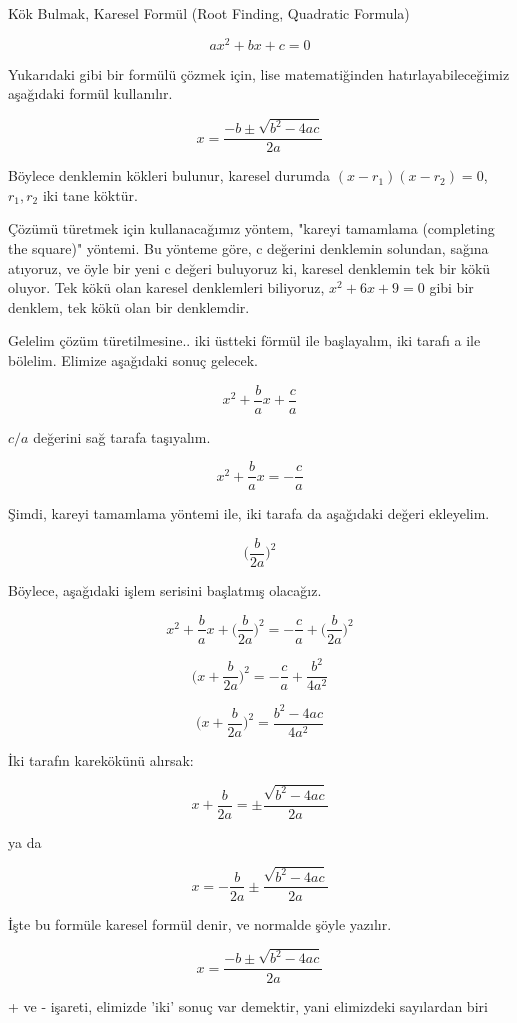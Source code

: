\documentclass[12pt,fleqn]{article}\usepackage{../../common}
\begin{document}
Kök Bulmak, Karesel Formül (Root Finding, Quadratic Formula)

$$ ax^2 + bx + c = 0$$

Yukarıdaki gibi bir formülü çözmek için, lise matematiğinden
hatırlayabileceğimiz aşağıdaki formül kullanılır.

$$ x = \frac{-b \pm \sqrt{b^2-4ac}}{2a} $$

Böylece denklemin kökleri bulunur, karesel durumda $(x-r_1)(x-r_2)=0$,
$r_1,r_2$ iki tane köktür.

Çözümü türetmek için kullanacağımız yöntem, "kareyi tamamlama (completing
the square)" yöntemi. Bu yönteme göre, c değerini denklemin solundan,
sağına atıyoruz, ve öyle bir yeni c değeri buluyoruz ki, karesel denklemin
tek bir kökü oluyor. Tek kökü olan karesel denklemleri biliyoruz, $x^2 +
6x + 9 = 0$ gibi bir denklem, tek kökü olan bir denklemdir.

Gelelim çözüm türetilmesine.. iki üstteki förmül ile başlayalım, iki tarafı
a ile bölelim. Elimize aşağıdaki sonuç gelecek.

$$ x^2 + \frac{b}{a}x + \frac{c}{a} $$

$c/a$ değerini sağ tarafa taşıyalım. 

$$ x^2 + \frac{b}{a}x = -\frac{c}{a} $$

Şimdi, kareyi tamamlama yöntemi ile, iki tarafa da aşağıdaki değeri ekleyelim.

$$ \bigg( \frac{b}{2a} \bigg)^2 $$

Böylece, aşağıdaki işlem serisini başlatmış olacağız.

$$ x^2 + \frac{b}{a}x + \bigg( \frac{b}{2a} \bigg)^2 = 
-\frac{c}{a} + \bigg( \frac{b}{2a} \bigg)^2 $$

$$ \bigg( x + \frac{b}{2a} \bigg)^2 = 
-\frac{c}{a} + \frac{b^2}{4a^2}
 $$

$$ \bigg( x+ \frac{b}{2a} \bigg)^2 = \frac{b^2 - 4ac}{4a^2} $$

İki tarafın karekökünü alırsak: 

$$ x + \frac{b}{2a} = \pm \frac{\sqrt{b^2 - 4ac}}{2a}  $$

ya da

$$ x = -\frac{b}{2a} \pm \frac{\sqrt{b^2 - 4ac}}{2a} $$

İşte bu formüle karesel formül denir, ve normalde şöyle yazılır. 

$$ x = \frac{-b \pm \sqrt{b^2-4ac}}{2a} $$

+ ve - işareti, elimizde 'iki' sonuç var demektir, yani elimizdeki
sayılardan biri
\end{document}
